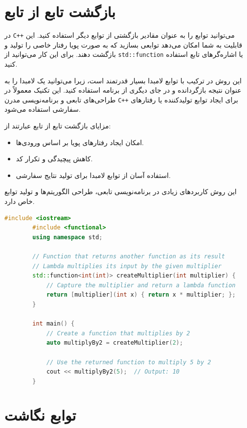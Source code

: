 \documentclass[12pt, a4paper]{report}
\begin{document}
\section{بازگشت تابع از تابع}

در \texttt{C++} می‌توانید توابع را به عنوان مقادیر بازگشتی از توابع دیگر استفاده کنید. این قابلیت به شما امکان می‌دهد توابعی بسازید که به صورت پویا رفتار خاصی را تولید و بازگشت دهند. برای این کار می‌توانید از \texttt{std::function} یا اشاره‌گرهای تابع استفاده کنید.

این روش در ترکیب با توابع لامبدا بسیار قدرتمند است، زیرا می‌توانید یک لامبدا را به عنوان نتیجه بازگردانده و در جای دیگری از برنامه استفاده کنید. این تکنیک معمولاً در طراحی‌های تابعی و برنامه‌نویسی مدرن \texttt{C++} برای ایجاد توابع تولیدکننده یا رفتارهای سفارشی استفاده می‌شود.

مزایای بازگشت تابع از تابع عبارتند از:
\begin{itemize}
	\item امکان ایجاد رفتارهای پویا بر اساس ورودی‌ها.
	\item کاهش پیچیدگی و تکرار کد.
	\item استفاده آسان از توابع لامبدا برای تولید نتایج سفارشی.
\end{itemize}

این روش کاربردهای زیادی در برنامه‌نویسی تابعی، طراحی الگوریتم‌ها و تولید توابع خاص دارد.

\begin{LTR} %
	\begin{lstlisting}[language=C++, breaklines=true]
		#include <iostream>
		#include <functional>
		using namespace std;
		
		// Function that returns another function as its result
		// Lambda multiplies its input by the given multiplier
		std::function<int(int)> createMultiplier(int multiplier) {
			// Capture the multiplier and return a lambda function
			return [multiplier](int x) { return x * multiplier; };
		}
		
		int main() {
			// Create a function that multiplies by 2
			auto multiplyBy2 = createMultiplier(2);
			
			// Use the returned function to multiply 5 by 2
			cout << multiplyBy2(5);  // Output: 10
		}
	\end{lstlisting}
\end{LTR}


\section{توابع نگاشت}
\end{document}
